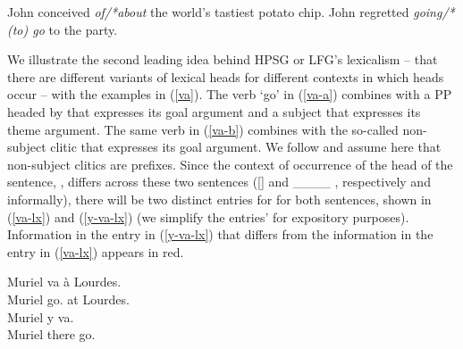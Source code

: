 \documentclass[output=paper
	        ,collection
	        ,collectionchapter
 	        ,biblatex
                ,babelshorthands
                ,newtxmath
                ,draftmode
                ,colorlinks, citecolor=brown
]{langscibook}
\begin{document}
\begin{exe}
	\ex\label{select}
	\begin{xlist}
		\ex\label{select-a}John conceived \emph{of/*about} the world's tastiest potato chip.
		\ex\label{select-b} John regretted \emph{going/*(to) go} to the party.
	\end{xlist}
\end{exe} 


We illustrate the second leading idea behind HPSG or LFG's lexicalism  -- that there are different variants of lexical heads for different contexts in which heads occur -- with the  examples in (\ref{va}).  The verb  `go' in (\ref{va-a}) combines with a PP headed by  that expresses its goal argument and a subject that expresses its theme argument. The same verb in (\ref{va-b}) combines with the so-called non-subject clitic  that expresses its goal argument. We follow \citet{MillerandSag1997} and assume here that  non-subject clitics are prefixes. Since the context of occurrence of the head of the sentence, , differs across these two sentences ([] and  \_\_\_\_ , respectively and informally), there will be two distinct entries for  for both sentences, shown in (\ref{va-lx}) and (\ref{y-va-lx}) (we simplify the entries'  for expository purposes). Information in the entry in (\ref{y-va-lx}) that differs from the information in the entry in (\ref{va-lx}) appears in red.

\begin{exe}
	\ex\label{va}
	\begin{xlist}
		\ex\label{va-a} \gll Muriel va à Lourdes. \\
		Muriel go. at Lourdes. \\
		\ex\label{va-b} \gll Muriel y va. \\
		Muriel there go.\ig{pres.3rd.sg} \\
	\end{xlist}	
\end{exe}
\end{document}
